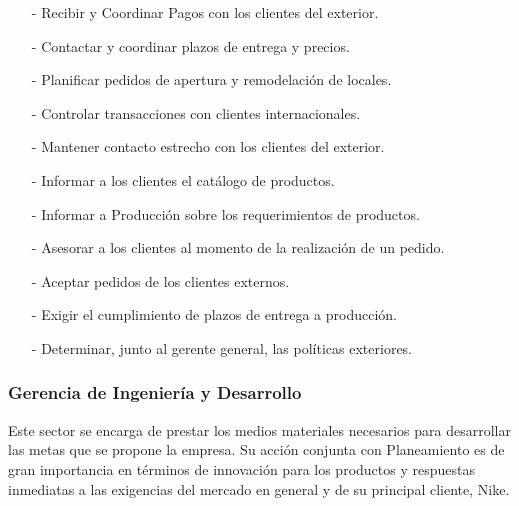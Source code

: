 \documentclass[a4paper,10pt,titlepage]{article}
\begin{document}

{
    \begin{itemize}
        \item[-] Recibir y Coordinar Pagos con los clientes del exterior.
        \item[-] Contactar y coordinar plazos de entrega y precios.
        \item[-] Planificar pedidos de apertura y remodelaci\'on de locales.
        \item[-] Controlar transacciones con clientes internacionales.
    \end{itemize}
}
{
    \begin{itemize}
        \item[-] Mantener contacto estrecho con los clientes del exterior.
        \item[-] Informar a los clientes el cat\'alogo de productos.
        \item[-] Informar a Producci\'on sobre los requerimientos de productos.
        \item[-] Asesorar a los clientes al momento de la realizaci\'on de un pedido.
	\item[-] Aceptar pedidos de los clientes externos.
    \end{itemize}
}
{
    \begin{itemize}
        \item[-] Exigir el cumplimiento de plazos de entrega a producci\'on.
        \item[-] Determinar, junto al gerente general, las pol\'iticas exteriores.
    \end{itemize}
}


\newpage

\subsubsection{Gerencia de Ingenier\'ia y Desarrollo}
\smallskip
Este sector se encarga de prestar los medios materiales necesarios para desarrollar las metas que se propone la empresa. 
Su acci\'on conjunta con Planeamiento es de gran importancia en t\'erminos de innovaci\'on para los productos y respuestas inmediatas a las exigencias 
del mercado en general y de su principal cliente, Nike.
\end{document}
